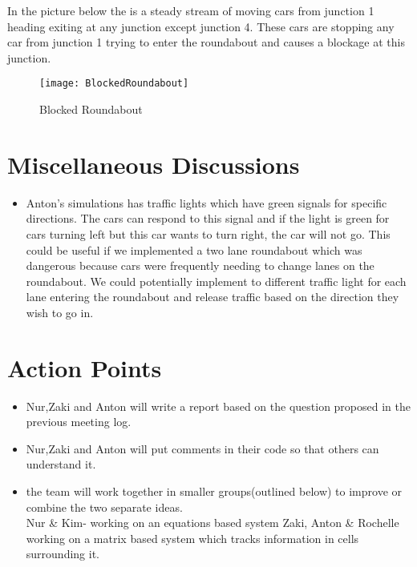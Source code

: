\documentclass{article}
\begin{document}
\begin{enumerate}
		In the picture below the is a steady stream of moving cars from junction 1 heading exiting at any junction except junction 4. These cars are stopping any car from junction 1 trying to enter the roundabout and causes a blockage at this junction. 
		\begin{figure}[h]
						\caption{Blocked Roundabout}
						\texttt{[image: BlockedRoundabout]}
						\centering
					\end{figure}
	\end{enumerate}
	
	
	\newpage
	\section*{Miscellaneous Discussions}
	\begin{itemize}
		\item Anton's simulations has traffic lights which have green signals for specific directions. The cars can respond to this signal and if the light is green for cars turning left but this car wants to turn right, the car will not go.
		This could be useful if we implemented a two lane roundabout which was dangerous because cars were frequently needing to change lanes on the roundabout. We could potentially implement to different traffic light for each lane entering the roundabout and release traffic based on the direction they wish to go in.  
	\end{itemize}
	\section*{Action Points}
		\begin{itemize}
			\item Nur,Zaki and Anton will write a report based on the question proposed in the previous meeting log. 
			\item Nur,Zaki and Anton will put comments in their code so that others can understand it. 
			\item the team will work together in smaller groups(outlined below) to improve or combine the two separate ideas. \\
			Nur \& Kim- working on an equations based system 
			Zaki, Anton \& Rochelle working on a matrix based system which tracks information in cells surrounding it. 
		\end{itemize}

	
		
	
\end{document}
